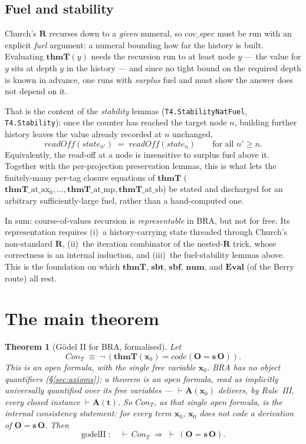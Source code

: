 \documentclass[11pt]{article}
\theoremstyle{plain}
\newtheorem{theorem}{Theorem}[section]
\theoremstyle{definition}
\theoremstyle{remark}
\newcommand{\code}[1]{\mathit{code}(#1)}
\newcommand{\sbf}{\mathbf{sbf}}
\newcommand{\sbt}{\mathbf{sbt}}
\newcommand{\thmT}{\mathbf{thmT}}
\newcommand{\num}{\mathbf{num}}
\newcommand{\Con}{\mathit{Con}}
\begin{document}
\subsection{Fuel and stability}

Church's $\mathbf{R}$ recurses down to a \emph{given} numeral, so
$\mathit{cov\_spec}$ must be run with an explicit \emph{fuel} argument: a
numeral bounding how far the history is built.  Evaluating $\thmT(y)$ needs
the recursion run to at least node $y$ --- the value for $y$ sits at depth
$y$ in the history --- and since no tight bound on the required depth is
known in advance, one runs with \emph{surplus} fuel and must show the answer
does not depend on it.

That is the content of the \emph{stability} lemmas
(\verb|T4.StabilityNatFuel|, \verb|T4.Stability|): once the counter has
reached the target node $n$, building further history leaves the value
already recorded at $n$ unchanged,
\[
\mathit{readOff}(\mathit{state}_{n'}) \;=\; \mathit{readOff}(\mathit{state}_n)
\qquad\text{for all } n' \ge n .
\]
Equivalently, the read-off at a node is insensitive to surplus fuel above
it.  Together with the per-projection preservation lemmas, this is what lets
the finitely-many per-tag closure equations of $\thmT$
($\thmT\_\mathrm{at}\_\mathrm{ax_0}, \ldots, \thmT\_\mathrm{at}\_\mathrm{mp},
\thmT\_\mathrm{at}\_\mathrm{sb}$) be stated and discharged for an arbitrary
sufficiently-large fuel, rather than a hand-computed one.

In sum: course-of-values recursion is \emph{representable} in BRA, but not
for free.  Its representation requires (i)~a history-carrying state threaded
through Church's non-standard $\mathbf{R}$, (ii)~the iteration combinator of
the nested-$\mathbf{R}$ trick, whose correctness is an internal induction,
and (iii)~the fuel-stability lemmas above.  This is the foundation on which
$\thmT$, $\sbt$, $\sbf$, $\num$, and $\mathbf{Eval}$ (of the Berry route)
all rest.

\section{The main theorem}

\begin{theorem}[G\"odel II for BRA, formalised]
\label{thm:godelII}
Let
\[
\Con_T \;\equiv\; \neg\,(\thmT(\mathbf{x}_0) = \code{\mathbf{O} = \mathbf{s}\,\mathbf{O}}).
\]
This is an \emph{open} formula, with the single free variable
$\mathbf{x}_0$.  BRA has no object quantifiers ({\S}\ref{sec:axioms}): a
theorem is an open formula, read as \emph{implicitly universally
quantified} over its free variables --- $\vdash\mathbf{A}(\mathbf{x}_0)$
delivers, by Rule~III, every closed instance $\vdash\mathbf{A}(\mathbf{t})$.
So $\Con_T$, as that single open formula, \emph{is} the internal
consistency statement: \emph{for every} term $\mathbf{x}_0$, $\mathbf{x}_0$
does not code a derivation of $\mathbf{O} = \mathbf{s}\,\mathbf{O}$.  Then
\[
\mathrm{godelII} \;:\quad {\vdash}\,\Con_T \;\Longrightarrow\; {\vdash}\,(\mathbf{O} = \mathbf{s}\,\mathbf{O}).
\]
\end{theorem}
\end{document}
